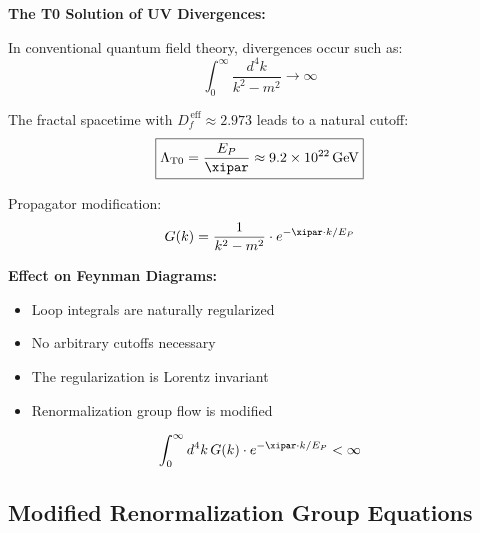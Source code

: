 	\begin{application}
		\textbf{The T0 Solution of UV Divergences:}
		
		In conventional quantum field theory, divergences occur such as:
		\begin{equation}
			\int_0^\infty \frac{d^4k}{k^2 - m^2} \to \infty
		\end{equation}
		
		The fractal spacetime with $D_f^{\,\text{eff}} \approx 2.973$ leads to a natural cutoff:
		\begin{equation}
			\boxed{\Lambda_{\text{T0}} = \frac{E_P}{\xipar} \approx 9.2 \times 10^{22}\, \text{GeV}}
		\end{equation}

		
		Propagator modification:
		\begin{equation}
			G(k) = \frac{1}{k^2 - m^2} \cdot e^{-\xipar \cdot k/E_P}
		\end{equation}
		
		\textbf{Effect on Feynman Diagrams:}
		\begin{itemize}
			\item Loop integrals are naturally regularized
			\item No arbitrary cutoffs necessary
			\item The regularization is Lorentz invariant
			\item Renormalization group flow is modified
		\end{itemize}
		
		\begin{equation}
			\int_0^\infty d^4k\, G(k) \cdot e^{-\xipar \cdot k/E_P} < \infty
		\end{equation}
	\end{application}
	
	\subsection{Modified Renormalization Group Equations}
	
